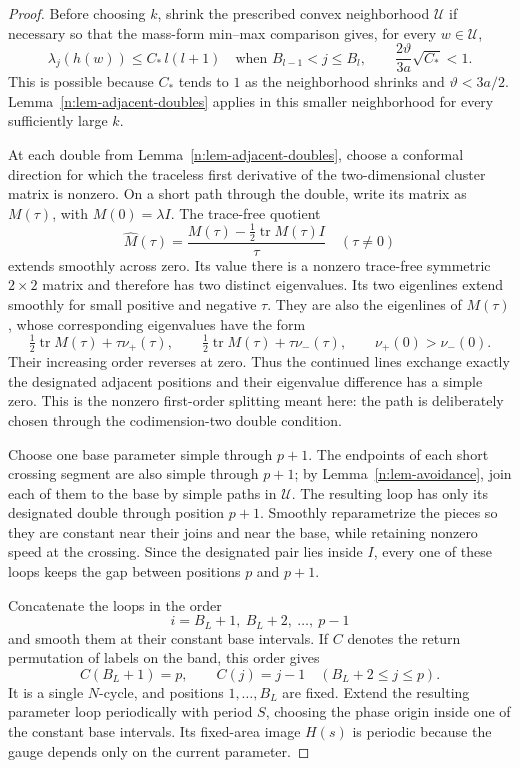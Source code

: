 \begin{proof}
Before choosing \(k\), shrink the prescribed convex neighborhood
\(\mathcal U\) if necessary so that the mass-form min--max comparison
gives, for every \(w\in\mathcal U\),
\begin{equation}\label{n:eq-near-round-frequency-bound}
 \lambda_j(h(w))\leq C_*\,l(l+1)
 \quad\text{when }B_{l-1}<j\leq B_l,
 \qquad \frac{2\vartheta}{3a}\sqrt{C_*}<1 .
\end{equation}
This is possible because \(C_*\) tends to \(1\) as the neighborhood
shrinks and \(\vartheta<3a/2\).  Lemma~\ref{n:lem-adjacent-doubles}
applies in this smaller neighborhood for every sufficiently large \(k\).

At each double from Lemma~\ref{n:lem-adjacent-doubles}, choose a
conformal direction for which the traceless first derivative of the
two-dimensional cluster matrix is nonzero.  On a short path
through the double, write its matrix as \(M(\tau)\), with
\(M(0)=\lambda I\).  The trace-free quotient
\[
 \widehat M(\tau)=
 \frac{M(\tau)-\tfrac12\operatorname{tr}M(\tau)I}{\tau}
 \quad(\tau\ne0)
\]
extends smoothly across zero.  Its value there is a nonzero
trace-free symmetric \(2\times2\) matrix and therefore has two
distinct eigenvalues.  Its two eigenlines extend smoothly for
small positive and negative \(\tau\).  They are also the
eigenlines of \(M(\tau)\), whose corresponding eigenvalues have
the form
\[
 \tfrac12\operatorname{tr}M(\tau)+\tau\nu_+(\tau),
 \qquad
 \tfrac12\operatorname{tr}M(\tau)+\tau\nu_-(\tau),
 \qquad \nu_+(0)>\nu_-(0).
\]
Their increasing order reverses at zero.  Thus the continued lines
exchange exactly the designated adjacent positions and their
eigenvalue difference has a simple zero.  This is the nonzero
first-order splitting meant here: the path is deliberately chosen
through the codimension-two double condition.

Choose one base parameter simple through \(p+1\).  The endpoints
of each short crossing segment are also simple through \(p+1\);
by Lemma~\ref{n:lem-avoidance}, join each of them to the base by
simple paths in \(\mathcal U\).  The resulting loop has only its
designated double through position \(p+1\).  Smoothly reparametrize
the pieces so they are constant near their joins and near the
base, while retaining nonzero speed at the crossing.  Since the
designated pair lies inside \(I\), every one of these loops keeps
the gap between positions \(p\) and \(p+1\).

Concatenate the loops in the order
\[
 i=B_L+1,\ B_L+2,\ \ldots,\ p-1
\]
and smooth them at their constant base intervals.  If \(C\) denotes
the return permutation of labels on the band, this order gives
\begin{equation}\label{n:eq-return-cycle}
 C(B_L+1)=p,\qquad C(j)=j-1\quad(B_L+2\leq j\leq p).
\end{equation}
It is a single \(N\)-cycle, and positions \(1,\ldots,B_L\) are
fixed.  Extend the resulting parameter loop periodically with period
\(S\), choosing the phase origin inside one of the constant base
intervals.  Its fixed-area image \(H(s)\) is periodic because the gauge
depends only on the current parameter.


\end{proof}
